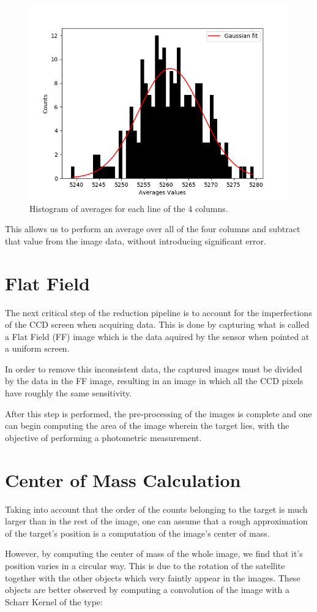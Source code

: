\documentclass{aa}
\begin{document}
\begin{figure}
\centering
\includegraphics[width=.4\textwidth]{overscan_hist.png}
\caption{Histogram of averages for each line of the 4 columns.}
\label{fig:overscan_hist}
\end{figure}

This allows us to perform an average over all of the four columns and subtract that value from the image data, without introducing significant error.

\section{Flat Field}

The next critical step of the reduction pipeline is to account for the imperfections of the CCD screen when acquiring data. This is done by capturing what is called a Flat Field (FF) image which is the data aquired by the sensor when pointed at a uniform screen.

In order to remove this inconsistent data, the captured images must be divided by the data in the FF image, resulting in an image in which all the CCD pixels have roughly the same sensitivity.

After this step is performed, the pre-processing of the images is complete and one can begin computing the area of the image wherein the target lies, with the objective of performing a photometric measurement.

\section{Center of Mass Calculation}

Taking into account that the order of the counts belonging to the target is much larger than in the rest of the image, one can assume that a rough approximation of the target's position is a computation of the image's center of mass.

However, by computing the center of mass of the whole image, we find that it's position varies in a circular way. This is due to the rotation of the satellite together with the other objects which very faintly appear in the images. These objects are better observed by computing a convolution of the image with a Scharr Kernel of the type:
\end{document}
